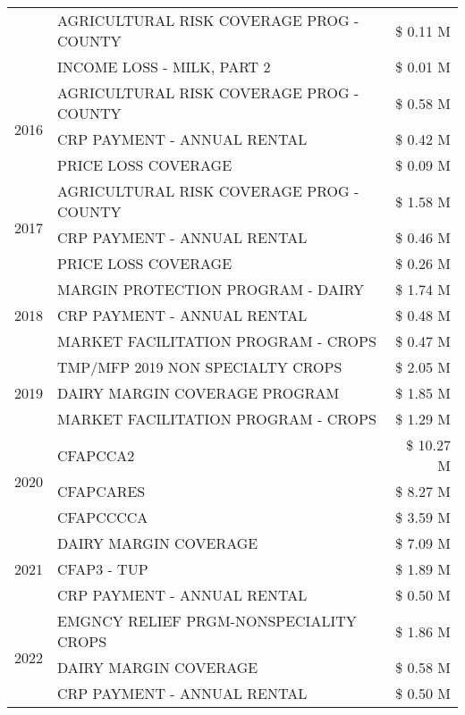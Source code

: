\begin{tabular}{llr}
 & AGRICULTURAL RISK COVERAGE PROG - COUNTY & \$ 0.11 M \\
 & INCOME LOSS - MILK, PART 2 & \$ 0.01 M \\
\cline{1-3}
\multirow[t]{3}{*}{2016} & AGRICULTURAL RISK COVERAGE PROG - COUNTY & \$ 0.58 M \\
 & CRP PAYMENT - ANNUAL RENTAL & \$ 0.42 M \\
 & PRICE LOSS COVERAGE & \$ 0.09 M \\
\cline{1-3}
\multirow[t]{3}{*}{2017} & AGRICULTURAL RISK COVERAGE PROG - COUNTY & \$ 1.58 M \\
 & CRP PAYMENT - ANNUAL RENTAL & \$ 0.46 M \\
 & PRICE LOSS COVERAGE & \$ 0.26 M \\
\cline{1-3}
\multirow[t]{3}{*}{2018} & MARGIN PROTECTION PROGRAM - DAIRY & \$ 1.74 M \\
 & CRP PAYMENT - ANNUAL RENTAL & \$ 0.48 M \\
 & MARKET FACILITATION PROGRAM - CROPS & \$ 0.47 M \\
\cline{1-3}
\multirow[t]{3}{*}{2019} & TMP/MFP 2019 NON SPECIALTY CROPS & \$ 2.05 M \\
 & DAIRY MARGIN COVERAGE PROGRAM & \$ 1.85 M \\
 & MARKET FACILITATION PROGRAM - CROPS & \$ 1.29 M \\
\cline{1-3}
\multirow[t]{3}{*}{2020} & CFAPCCA2 & \$ 10.27 M \\
 & CFAPCARES & \$ 8.27 M \\
 & CFAPCCCCA & \$ 3.59 M \\
\cline{1-3}
\multirow[t]{3}{*}{2021} & DAIRY MARGIN COVERAGE & \$ 7.09 M \\
 & CFAP3 - TUP & \$ 1.89 M \\
 & CRP PAYMENT - ANNUAL RENTAL & \$ 0.50 M \\
\cline{1-3}
\multirow[t]{3}{*}{2022} & EMGNCY RELIEF PRGM-NONSPECIALITY CROPS & \$ 1.86 M \\
 & DAIRY MARGIN COVERAGE & \$ 0.58 M \\
 & CRP PAYMENT - ANNUAL RENTAL & \$ 0.50 M \\
\cline{1-3}
\bottomrule
\end{tabular}

